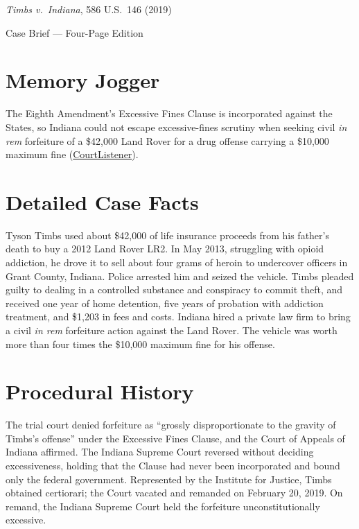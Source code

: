 \documentclass[12pt]{article}
\begin{document}
\begin{center}
{\LARGE \textit{Timbs v.\ Indiana}, 586 U.S.\ 146 (2019)\par}
\vspace{0.8em}
{\large Case Brief --- Four-Page Edition\par}
\end{center}
\vspace{1em}

\section{Memory Jogger}

The Eighth Amendment's Excessive Fines Clause is incorporated against the States, so Indiana could not escape excessive-fines scrutiny when seeking civil \textit{in rem} forfeiture of a \$42,000 Land Rover for a drug offense carrying a \$10,000 maximum fine (\href{https://www.courtlistener.com/opinion/4591916/timbs-v-indiana/}{CourtListener}).

\section{Detailed Case Facts}

Tyson Timbs used about \$42,000 of life insurance proceeds from his father's death to buy a 2012 Land Rover LR2. In May 2013, struggling with opioid addiction, he drove it to sell about four grams of heroin to undercover officers in Grant County, Indiana. Police arrested him and seized the vehicle. Timbs pleaded guilty to dealing in a controlled substance and conspiracy to commit theft, and received one year of home detention, five years of probation with addiction treatment, and \$1,203 in fees and costs. Indiana hired a private law firm to bring a civil \textit{in rem} forfeiture action against the Land Rover. The vehicle was worth more than four times the \$10,000 maximum fine for his offense.

\section{Procedural History}

The trial court denied forfeiture as ``grossly disproportionate to the gravity of Timbs's offense'' under the Excessive Fines Clause, and the Court of Appeals of Indiana affirmed. The Indiana Supreme Court reversed without deciding excessiveness, holding that the Clause had never been incorporated and bound only the federal government. Represented by the Institute for Justice, Timbs obtained certiorari; the Court vacated and remanded on February 20, 2019. On remand, the Indiana Supreme Court held the forfeiture unconstitutionally excessive.
\end{document}
